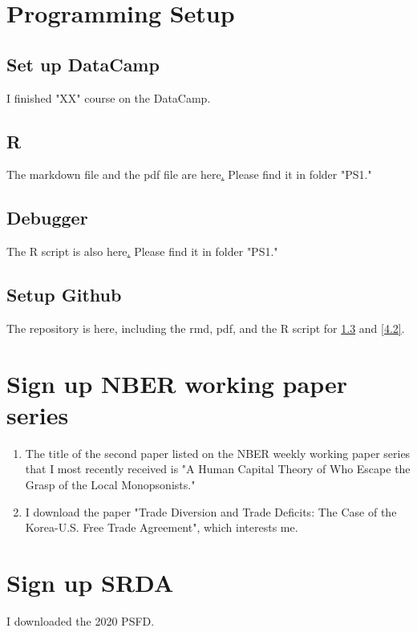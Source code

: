 \documentclass[12pt]{article}
\begin{document}
\section{Programming Setup}

\subsection{Set up DataCamp}
I finished "XX" course on the DataCamp.

\subsection{R}
The markdown file and the pdf file are here\href{https://github.com/JayChang426/ECON-7069.git}.\label{web} Please find it in folder "PS1."

\subsection{Debugger} \label{1.3}
The R script is also here\href{https://github.com/JayChang426/ECON-7069.git}.\label{web} Please find it in folder "PS1."

\subsection{Setup Github}
The repository is here\href{https://github.com/JayChang426/ECON-7069.git}, \label{web}
including the rmd, pdf, and the R script for \ref{1.3} and \ref{4.2}.

\section{Sign up NBER working paper series}
\begin{enumerate}
    \item The title of the second paper listed on the NBER weekly working paper series that I most recently received is "A Human Capital Theory of Who Escape the Grasp of the Local Monopsonists."
    \item I download the paper "Trade Diversion and Trade Deficits: The Case of the Korea-U.S. Free Trade Agreement", which interests me.
\end{enumerate}

\section{Sign up SRDA}
I downloaded the 2020 PSFD.
\end{document}
